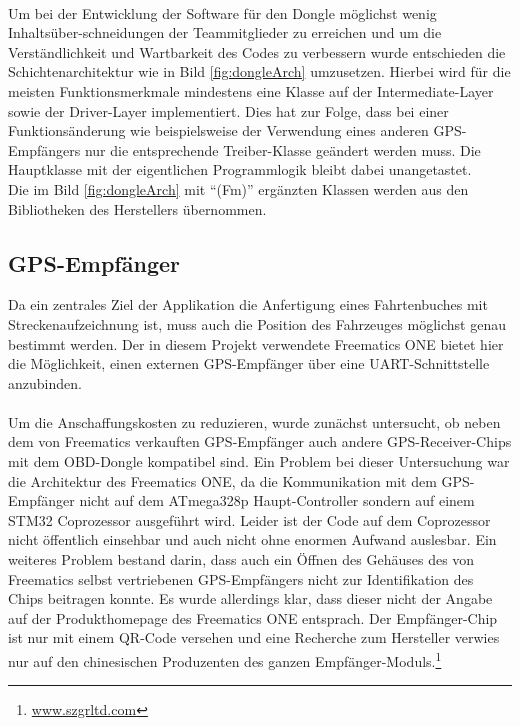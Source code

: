 \paragraph{}
Um bei der Entwicklung der Software für den Dongle möglichst wenig Inhaltsüber-schneidungen der Teammitglieder zu erreichen und um die Verständlichkeit und Wartbarkeit des Codes zu verbessern wurde entschieden die Schichtenarchitektur wie in Bild \ref{fig:dongleArch} umzusetzen.
Hierbei wird für die meisten Funktionsmerkmale mindestens eine Klasse auf der Intermediate-Layer sowie der Driver-Layer implementiert. Dies hat zur Folge, dass bei einer Funktionsänderung wie beispielsweise der Verwendung eines anderen GPS-Empfängers nur die entsprechende Treiber-Klasse geändert werden muss. Die Hauptklasse mit der eigentlichen Programmlogik bleibt dabei unangetastet.\\
Die im Bild \ref{fig:dongleArch} mit \enquote{(Fm)} ergänzten Klassen werden aus den Bibliotheken des Herstellers übernommen.
\subsection{GPS-Empfänger}
Da ein zentrales Ziel der Applikation die Anfertigung eines Fahrtenbuches mit Streckenaufzeichnung ist, muss auch die Position des Fahrzeuges möglichst genau bestimmt werden. Der in diesem Projekt verwendete Freematics ONE bietet hier die Möglichkeit, einen externen GPS-Empfänger über eine \ac{UART}-Schnittstelle anzubinden.
\paragraph{}
Um die Anschaffungskosten zu reduzieren, wurde zunächst untersucht, ob neben dem von Freematics verkauften GPS-Empfänger auch andere GPS-Receiver-Chips mit dem OBD-Dongle kompatibel sind.
Ein Problem bei dieser Untersuchung war die Architektur des Freematics ONE, da die Kommunikation mit dem GPS-Empfänger nicht auf dem ATmega328p Haupt-Controller sondern auf einem STM32 Coprozessor ausgeführt wird. Leider ist der Code auf dem Coprozessor nicht öffentlich einsehbar und auch nicht ohne enormen Aufwand auslesbar.
Ein weiteres Problem bestand darin, dass auch ein Öffnen des Gehäuses des von Freematics selbst vertriebenen GPS-Empfängers nicht zur Identifikation des Chips beitragen konnte. Es wurde allerdings klar, dass dieser nicht der Angabe auf der Produkthomepage des Freematics ONE entsprach. Der Empfänger-Chip ist nur mit einem QR-Code versehen und eine Recherche zum Hersteller verwies nur auf den chinesischen Produzenten des ganzen Empfänger-Moduls.\footnote{\url{www.szgrltd.com}}
